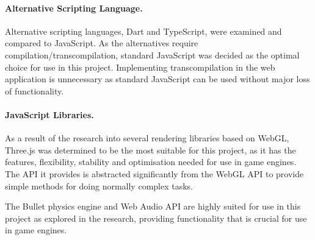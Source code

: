 \paragraph{Alternative Scripting Language.}
Alternative scripting languages, Dart and TypeScript, were examined and compared to JavaScript. As the alternatives require compilation/transcompilation, standard JavaScript was decided as the optimal choice for use in this project. Implementing transcompilation in the web application is unnecessary as standard JavaScript can be used without major loss of functionality.

\paragraph{JavaScript Libraries.}
As a result of the research into several rendering libraries based on WebGL, Three.js was determined to be the most suitable for this project, as it has the features, flexibility, stability and optimisation needed for use in game engines. The API it provides is abstracted significantly from the WebGL API to provide simple methods for doing normally complex tasks.

The Bullet physics engine and Web Audio API are highly suited for use in this project as explored in the research, providing functionality that is crucial for use in game engines.
